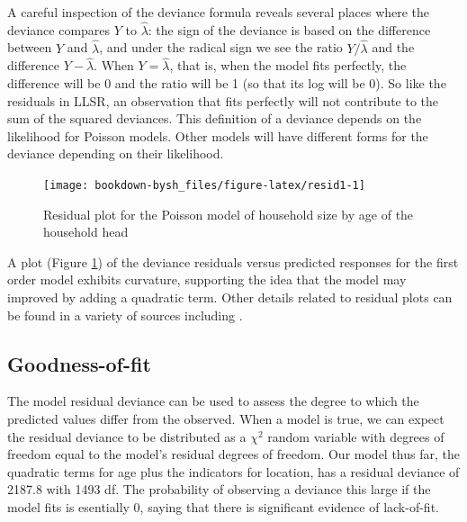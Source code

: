 \documentclass[
]{krantz}
\newenvironment{Shaded}{\begin{snugshade}}{\end{snugshade}}
\newcommand{\CommentTok}[1]{\textcolor[rgb]{0.37,0.37,0.37}{\textit{#1}}}
\newcommand{\DecValTok}[1]{\textcolor[rgb]{0.06,0.06,0.06}{#1}}
\newcommand{\KeywordTok}[1]{\textcolor[rgb]{0.27,0.27,0.27}{\textbf{#1}}}
\newcommand{\NormalTok}[1]{#1}
\newcommand{\OperatorTok}[1]{\textcolor[rgb]{0.43,0.43,0.43}{\textbf{#1}}}
\begin{document}
A careful inspection of the deviance formula reveals several places where the deviance compares \(Y\) to \(\hat{\lambda}\): the sign of the deviance is based on the difference between \(Y\) and \(\hat{\lambda}\), and under the radical sign we see the ratio \(Y/\hat{\lambda}\) and the difference \(Y -\hat{\lambda}\). When \(Y = \hat{\lambda}\), that is, when the model fits perfectly, the difference will be 0 and the ratio will be 1 (so that its log will be 0). So like the residuals in LLSR, an observation that fits perfectly will not contribute to the sum of the squared deviances. This definition of a deviance depends on the likelihood for Poisson models. Other models will have different forms for the deviance depending on their likelihood.

\begin{figure}

{\centering \texttt{[image: bookdown-bysh\_files/figure-latex/resid1-1]} 

}

\caption{Residual plot for the Poisson model of household size by age of the household head}\label{fig:resid1}
\end{figure}

A plot (Figure \ref{fig:resid1}) of the deviance residuals versus predicted responses for the first order model exhibits curvature, supporting the idea that the model may improved by adding a quadratic term. Other details related to residual plots can be found in a variety of sources including \citet{McCullagh1989}.

\hypertarget{sec-PoisGOF}{%
\subsection{Goodness-of-fit}\label{sec-PoisGOF}}

The model residual deviance can be used to assess the degree to which the predicted values differ from the observed. When a model is true, we can expect the residual deviance to be distributed as a \(\chi^2\) random variable with degrees of freedom equal to the model's residual degrees of freedom. Our model thus far, the quadratic terms for age plus the indicators for location, has a residual deviance of 2187.8 with 1493 df. The probability of observing a deviance this large if the model fits is esentially 0, saying that there is significant evidence of lack-of-fit.

\begin{Shaded}
\end{Shaded}
\end{document}
